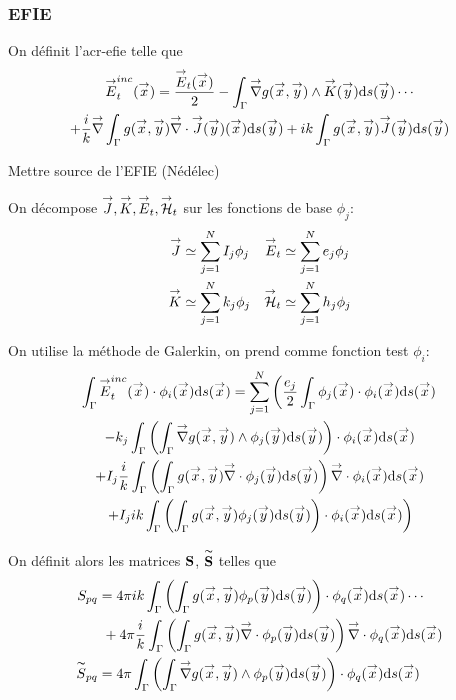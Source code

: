     \subsubsection{EFIE}
      On définit l'\gls{acr-efie} telle que
      \begin{multline}
        \label{eq:form_int:EFIE}
        \vE^{inc}_t(\vx) =
          \frac{\vE_t(\vx)}{2} 
            - \int_\Gamma \vgrad g(\vx,\vy) \pvect \vK(\vy) \dd{s}(\vy) \cdots \\
          + \frac{i}{k}\vgrad \int_\Gamma  g(\vx,\vy)\vdiv\vJ(\vy)(\vx) \dd{s}(\vy)
            +  ik\int_\Gamma g(\vx,\vy)\vJ(\vy) \dd{s}(\vy)
      \end{multline}
      \begin{TODO}
        Mettre source de l'EFIE (Nédélec)
      \end{TODO}

      On décompose \(\vJ,\vK,\vE_t,\vH_t\) sur les fonctions de base \(\phi_j\):
      \begin{subequations}
        \begin{align}
          \vJ &\simeq \sum_{j=1}^N I_j \phi_j & \vE_t &\simeq \sum_{j=1}^N e_j \phi_j\\
          \vK &\simeq \sum_{j=1}^N k_j \phi_j & \vH_t &\simeq \sum_{j=1}^N h_j \phi_j
        \end{align}
      \end{subequations}

      On utilise la méthode de Galerkin, on prend comme fonction test \(\phi_i\): 
      \begin{multline}
      \int_\Gamma \vE^{inc}_t(\vx) \cdot \phi_i(\vx) \dd{s}(\vx) = \sum_{j=1}^{N} \left( 
        \frac{e_j}{2} \int_\Gamma \phi_j(\vx) \cdot \phi_i(\vx) \dd{s}(\vx)\right. \\
        -  k_j \int_\Gamma\left(\int_\Gamma \vgrad g(\vx,\vy) \pvect \phi_j(\vy) \dd{s}(\vy)\right) \cdot \phi_i(\vx) \dd{s}(\vx) \\
        + I_j\frac{i}{k}\int_\Gamma
          \left(\int_\Gamma g(\vx,\vy)\vdiv\phi_j(\vy) \dd{s}(\vy)\right) \vdiv \phi_i(\vx) \dd{s}(\vx) \\
      \left.
        + I_j ik \int_\Gamma \left(\int_\Gamma g(\vx,\vy)\phi_j(\vy) \dd{s}(\vy)\right)\cdot \phi_i(\vx) \dd{s}(\vx)
      \right)
      \end{multline}

      On définit alors les matrices \(\mS\), \(\mSt\) telles que
      \begin{align}
        S_{pq} 
          &= 4\pi ik \int_\Gamma \left( \int_\Gamma g(\vx,\vy) \phi_p(\vy) \dd{s}(\vy) \right) \cdot \phi_q (\vx)\dd{s}(\vx) \cdots\\
          &~+ 4\pi \frac{i}{k}\int_\Gamma \left( \int_\Gamma g(\vx,\vy) \vdiv \phi_p (\vy) \dd{s}(\vy) \right) \vdiv \phi_q(\vx)\dd{s}(\vx)\\ 
        \tilde{S}_{pq}
          &= 4\pi \int_\Gamma \left( \int_\Gamma \vgrad g(\vx,\vy) \pvect \phi_p(\vy) \dd{s}(\vy) \right) \cdot \phi_q(\vx)\dd{s}(\vx)
      \end{align}

